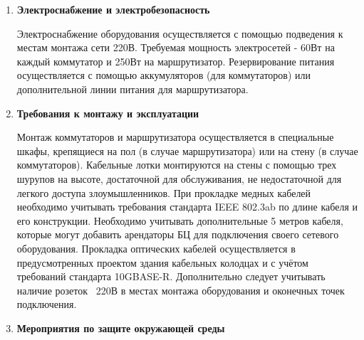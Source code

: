 \documentclass[a4paper,14pt]{extarticle}
\begin{document}
\begin{enumerate}
        \item \textbf{Электроснабжение и электробезопасность}\par
        Электроснабжение оборудования осуществляется с помощью подведения к местам монтажа сети 220В. Требуемая мощность электросетей - 
        60Вт на каждый коммутатор и 250Вт на маршрутизатор. Резервирование питания осуществляется с помощью аккумуляторов (для 
        коммутаторов) или дополнительной линии питания для маршрутизатора.
        \item \textbf{Требования к монтажу и эксплуатации}\par
        Монтаж коммутаторов и маршрутизатора осуществляется в специальные шкафы, крепящиеся на пол (в случае маршрутизатора) или на стену 
        (в случае коммутаторов). Кабельные лотки монтируются на стены с помощью трех шурупов на высоте, достаточной для обслуживания, не 
        недостаточной для легкого доступа злоумышленников. При прокладке медных кабелей необходимо учитывать требования стандарта IEEE 802.3ab 
        по длине кабеля и его конструкции. Необходимо учитывать дополнительные 5 метров кабеля, которые могут добавить арендаторы БЦ для 
        подключения своего сетевого оборудования. Прокладка оптических кабелей осуществляется в предусмотренных проектом здания кабельных колодцах 
        и с учётом требований стандарта 10GBASE-R. Дополнительно следует учитывать наличие розеток ~220В в местах монтажа оборудования и оконечных 
        точек подключения.
        \item \textbf{Мероприятия по защите окружающей среды}\par



    \end{enumerate}
\end{document}
